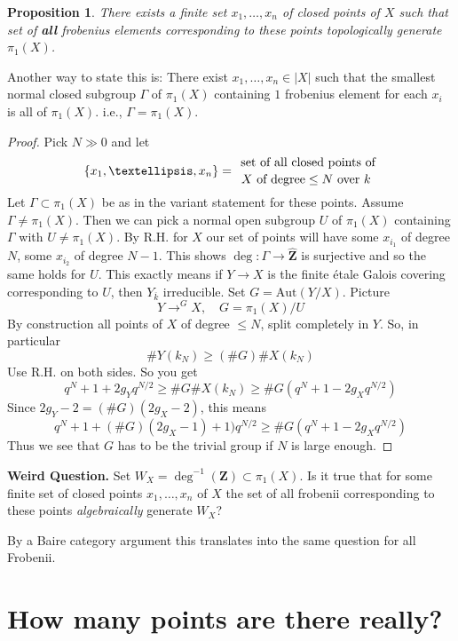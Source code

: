 \documentclass{stacks-project}
\theoremstyle{plain}
\newtheorem{proposition}[subsection]{Proposition}
\theoremstyle{definition}
\theoremstyle{remark}
\numberwithin{equation}{subsection}
\begin{document}
\begin{proposition}
\label{proposition-finite-set-frobenii-generate-topologically}
There exists a finite set $x_1, \ldots, x_n$ of closed points of $X$
such that set of {\bf all} frobenius elements corresponding to these
points topologically generate $\pi_1(X)$.
\end{proposition}

\noindent
Another way to state this is:
There exist $x_1, \ldots, x_n\in |X|$ such that
the smallest normal closed subgroup $\Gamma$ of $\pi_1(X)$
containing $1$ frobenius element for each $x_i$ is all of $\pi_1(X)$. i.e.,
$\Gamma = \pi_1(X)$.

\begin{proof}
Pick $N\gg 0$ and let
$$
\{x_1, \ldots, x_n\} =
{\text{ set of all closed points of}
\atop X \text{ of degree} \leq N\text{ over } k}
$$
Let $\Gamma\subset \pi_1(X)$ be as in the variant statement for these
points. Assume $\Gamma \neq \pi_1(X)$. Then we can pick a normal open
subgroup $U$ of $\pi_1(X)$ containing $\Gamma$ with
$U \neq \pi_1(X)$. By R.H. for $X$ our set of points will have some
$x_{i_1}$ of degree $N$, some $x_{i_2}$ of degree $N - 1$. This shows
$\deg : \Gamma \to \widehat{\mathbf{Z}}$ is surjective
and so the same holds for $U$. This exactly
means if $Y \to X$ is the finite \'etale Galois covering
corresponding to $U$, then $Y_{\overline{k}}$ irreducible.
Set $G = \text{Aut}(Y/X)$. Picture
$$
Y \to^G X,\quad G = \pi_1(X)/U
$$
By construction all points of $X$ of degree $\leq N$, split
completely in $Y$. So, in particular
$$
\# Y(k_N)\geq (\# G)\# X(k_N)
$$
Use R.H. on both sides. So you get
$$
q^N+1+2g_Yq^{N/2}\geq \# G\# X(k_N)\geq \#
G(q^N+1-2g_Xq^{N/2})
$$
Since $2g_Y-2 = (\# G)(2g_X-2)$, this means
$$
q^N + 1 + (\# G)(2g_X - 1) + 1)q^{N/2}\geq
\# G (q^N + 1 - 2g_Xq^{N/2})
$$
Thus we see that $G$ has to be the trivial group if $N$ is large enough.
\end{proof}

\noindent
{\bf Weird Question.}
Set $W_X = \deg^{-1}(\mathbf{Z})\subset \pi_1(X)$.
Is it true that for some finite set of closed points $x_1, \ldots, x_n$ of $X$
the set of all frobenii corresponding to these points
{\it algebraically} generate $W_X$?

\medskip\noindent
By a Baire category argument this translates into the same question
for all Frobenii.





\section{How many points are there really?}
\label{section-really}
\end{document}
